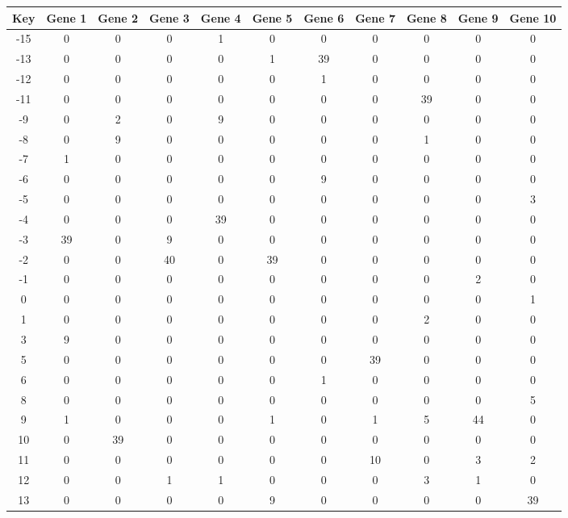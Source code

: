 \begin{tabular}{|c|c|c|c|c|c|c|c|c|c|c|}
\hline
Key & Gene 1 & Gene 2 & Gene 3 & Gene 4 & Gene 5 & Gene 6 & Gene 7 & Gene 8 & Gene 9 & Gene 10 \\
\hline
-15 & 0 & 0 & 0 & 1 & 0 & 0 & 0 & 0 & 0 & 0 \\
-13 & 0 & 0 & 0 & 0 & 1 & 39 & 0 & 0 & 0 & 0 \\
-12 & 0 & 0 & 0 & 0 & 0 & 1 & 0 & 0 & 0 & 0 \\
-11 & 0 & 0 & 0 & 0 & 0 & 0 & 0 & 39 & 0 & 0 \\
-9 & 0 & 2 & 0 & 9 & 0 & 0 & 0 & 0 & 0 & 0 \\
-8 & 0 & 9 & 0 & 0 & 0 & 0 & 0 & 1 & 0 & 0 \\
-7 & 1 & 0 & 0 & 0 & 0 & 0 & 0 & 0 & 0 & 0 \\
-6 & 0 & 0 & 0 & 0 & 0 & 9 & 0 & 0 & 0 & 0 \\
-5 & 0 & 0 & 0 & 0 & 0 & 0 & 0 & 0 & 0 & 3 \\
-4 & 0 & 0 & 0 & 39 & 0 & 0 & 0 & 0 & 0 & 0 \\
-3 & 39 & 0 & 9 & 0 & 0 & 0 & 0 & 0 & 0 & 0 \\
-2 & 0 & 0 & 40 & 0 & 39 & 0 & 0 & 0 & 0 & 0 \\
-1 & 0 & 0 & 0 & 0 & 0 & 0 & 0 & 0 & 2 & 0 \\
0 & 0 & 0 & 0 & 0 & 0 & 0 & 0 & 0 & 0 & 1 \\
1 & 0 & 0 & 0 & 0 & 0 & 0 & 0 & 2 & 0 & 0 \\
3 & 9 & 0 & 0 & 0 & 0 & 0 & 0 & 0 & 0 & 0 \\
5 & 0 & 0 & 0 & 0 & 0 & 0 & 39 & 0 & 0 & 0 \\
6 & 0 & 0 & 0 & 0 & 0 & 1 & 0 & 0 & 0 & 0 \\
8 & 0 & 0 & 0 & 0 & 0 & 0 & 0 & 0 & 0 & 5 \\
9 & 1 & 0 & 0 & 0 & 1 & 0 & 1 & 5 & 44 & 0 \\
10 & 0 & 39 & 0 & 0 & 0 & 0 & 0 & 0 & 0 & 0 \\
11 & 0 & 0 & 0 & 0 & 0 & 0 & 10 & 0 & 3 & 2 \\
12 & 0 & 0 & 1 & 1 & 0 & 0 & 0 & 3 & 1 & 0 \\
13 & 0 & 0 & 0 & 0 & 9 & 0 & 0 & 0 & 0 & 39 \\
\hline
\end{tabular}
